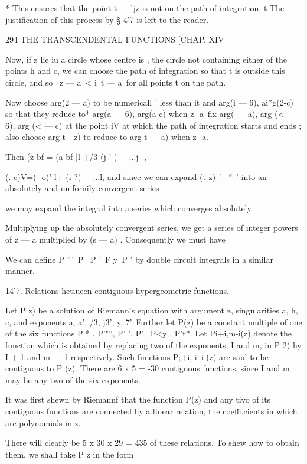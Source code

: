 * This ensures that the point t — ljz is not on the path of integration, 
t The justification of this process by § 4'7 is left to the reader. 



294 THE TRANSCENDENTAL FUNCTIONS [CHAP. XIV 

Now, if z lie iu a circle whose centre is  , the circle not containing either of the points 
h and c, we can choose the path of integration so that t is outside this circle, and so 
\ z — a\ < i\ t — a\ for all points t on the path. 

Now choose arg(2 — a) to be numericall ' less than it and arg(i — 6), ai*g(2-c) so that 
they reduce to* arg(a — 6), arg(a-c) when z- a\ fix arg(  — a), arg (< — 6), arg (< — c) at 
the point iV at which the path of integration starts and ends ; also choose arg  t - z) to 
reduce to arg  t — a) when z- a. 

Then (z-bf = (a-bf |l +/3 (j ' ) + ...j- , 

(.-c)V=( -o)' l+ (i ?) + ...l, 
and since we can expand (t-z)~' ~°~'  into an absolutely and uuifornily convergent series 

we may expand the integral into a series which converges absolutely. 

Multiplying up the absolutely convergent series, we get a series of integer powers of 
z — a multiplied by (s — a) . Consequently we must have 

We can define P '''\ P \ P '\ F y\ P '  by double circuit integrals in a similar 
manner. 

14'7. Relations hetiueen contiguous hypergeometric functions. 

Let P z) be a solution of Riemann's equation with argument z, singularities 
a, h, c, and exponents a, a', /3, j3', y, 7'. Further let P(z) be a constant 
multiple of one of the six functions P * , P'"'', P' ', P' \ P<y , P't*. Let 
Pi+i,m-i(z) denote the function which is obtained by replacing two of the 
exponents, I and m, in P 2) hy I + 1 and m — 1 respectively. Such functions 
P;+i, i\ i (z) are said to be contiguous to P (z). There are 6 x 5 = -30 contiguous 
functions, since I and m may be any two of the six exponents. 

It was first shewn by Riemannf that the function P(z) and any tivo of 
its contiguous functions are connected hy a linear relation, the coeffi,cients in 
which are polynomials in z. 

There will clearly be 5 x 30 x 29 = 435 of these relations. To shew how 
to obtain them, we shall take P  z  in the form 

